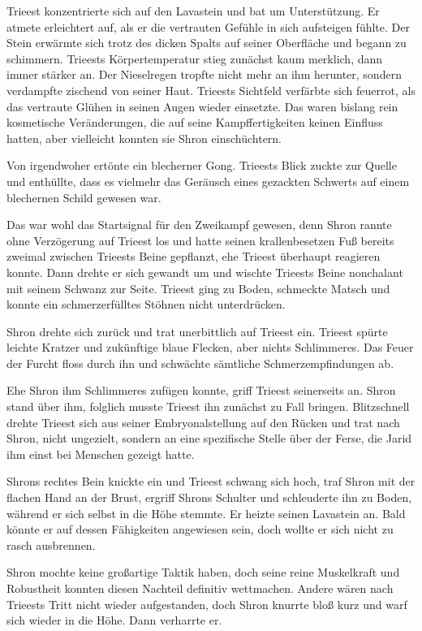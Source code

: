 Trieest konzentrierte sich auf den Lavastein und bat um Unterstützung. Er atmete erleichtert auf, als er die vertrauten Gefühle in sich aufsteigen fühlte. Der Stein erwärmte sich trotz des dicken Spalts auf seiner Oberfläche und begann zu schimmern. Trieests Körpertemperatur stieg zunächst kaum merklich, dann immer stärker an. Der Nieselregen tropfte nicht mehr an ihm herunter, sondern verdampfte zischend von seiner Haut. Trieests Sichtfeld verfärbte sich feuerrot, als das vertraute Glühen in seinen Augen wieder einsetzte. Das waren bislang rein kosmetische Veränderungen, die auf seine Kampffertigkeiten keinen Einfluss hatten, aber vielleicht konnten sie Shron einschüchtern.

Von irgendwoher ertönte ein blecherner Gong. Trieests Blick zuckte zur Quelle und enthüllte, dass es vielmehr das Geräusch eines gezackten Schwerts auf einem blechernen Schild gewesen war.

Das war wohl das Startsignal für den Zweikampf gewesen, denn Shron rannte ohne Verzögerung auf Trieest los und hatte seinen krallenbesetzen Fuß bereits zweimal zwischen Trieests Beine gepflanzt, ehe Trieest überhaupt reagieren konnte. Dann drehte er sich gewandt um und wischte Trieests Beine nonchalant mit seinem Schwanz zur Seite. Trieest ging zu Boden, schmeckte Matsch und konnte ein schmerzerfülltes Stöhnen nicht unterdrücken.

Shron drehte sich zurück und trat unerbittlich auf Trieest ein. Trieest spürte leichte Kratzer und zukünftige blaue Flecken, aber nichts Schlimmeres. Das Feuer der Furcht floss durch ihn und schwächte sämtliche Schmerzempfindungen ab.

Ehe Shron ihm Schlimmeres zufügen konnte, griff Trieest seinerseits an. Shron stand über ihm, folglich musste Trieest ihn zunächst zu Fall bringen. Blitzschnell drehte Trieest sich aus seiner Embryonalstellung auf den Rücken und trat nach Shron, nicht ungezielt, sondern an eine spezifische Stelle über der Ferse, die Jarid ihm einst bei Menschen gezeigt hatte.

Shrons rechtes Bein knickte ein und Trieest schwang sich hoch, traf Shron mit der flachen Hand an der Brust, ergriff Shrons Schulter und schleuderte ihn zu Boden, während er sich selbst in die Höhe stemmte. Er heizte seinen Lavastein an. Bald könnte er auf dessen Fähigkeiten angewiesen sein, doch wollte er sich nicht zu rasch ausbrennen.

Shron mochte keine großartige Taktik haben, doch seine reine Muskelkraft und Robustheit konnten diesen Nachteil definitiv wettmachen. Andere wären nach Trieests Tritt nicht wieder aufgestanden, doch Shron knurrte bloß kurz und warf sich wieder in die Höhe. Dann verharrte er.

